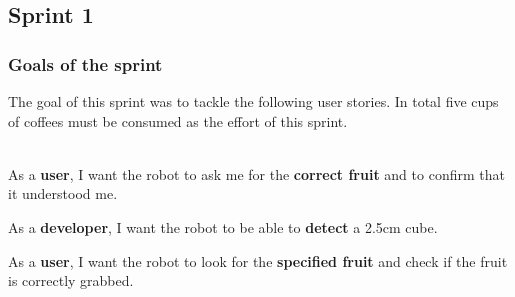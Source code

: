 \newpage
\subsection{Sprint 1} \label{sec:sprint1}
\subsubsection{Goals of the sprint}\label{sec:sprint1goals}
\noindent The goal of this sprint was to tackle the following user stories. In total five cups of coffees must be consumed as the effort of this sprint.\\
~\\
\begin{minipage}[t]{0.35\textwidth}
	\begin{StickyNote}[Priority 2]
		As a \textbf{user}, I want the robot to ask me for the \textbf{correct fruit} and to confirm that it understood me.
	\end{StickyNote}
\end{minipage}
\begin{minipage}[t]{0.3\textwidth}
		\begin{StickyNote}[Priority 3]
		As a \textbf{developer}, I want the robot to be able to \textbf{detect} a 2.5cm cube.
	\end{StickyNote}
\end{minipage}
\begin{minipage}[t]{0.35\textwidth}
	\begin{StickyNote}[Priority 4]
	As a \textbf{user}, I want the robot to look for the \textbf{specified fruit} and check if the fruit is correctly grabbed.
\end{StickyNote}
\end{minipage}

